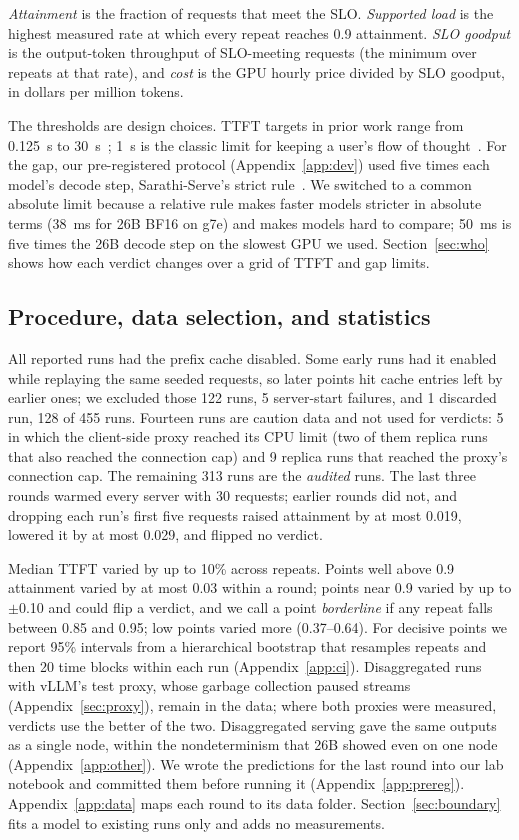 \documentclass[11pt]{article}
\begin{document}
\emph{Attainment} is the fraction of requests that meet the SLO. \emph{Supported load} is the highest measured rate at which every repeat reaches 0.9 attainment. \emph{SLO goodput} is the output-token throughput of SLO-meeting requests (the minimum over repeats at that rate), and \emph{cost} is the GPU hourly price divided by SLO goodput, in dollars per million tokens.

The thresholds are design choices. TTFT targets in prior work range from 0.125~s to 30~s~\cite{distserve,mooncake}; 1~s is the classic limit for keeping a user's flow of thought~\cite{nielsen}. For the gap, our pre-registered protocol (Appendix~\ref{app:dev}) used five times each model's decode step, Sarathi-Serve's strict rule~\cite{sarathi}. We switched to a common absolute limit because a relative rule makes faster models stricter in absolute terms (38~ms for 26B BF16 on g7e) and makes models hard to compare; 50~ms is five times the 26B decode step on the slowest GPU we used. Section~\ref{sec:who} shows how each verdict changes over a grid of TTFT and gap limits.

\subsection{Procedure, data selection, and statistics}\label{sec:procedure}
All reported runs had the prefix cache disabled. Some early runs had it enabled while replaying the same seeded requests, so later points hit cache entries left by earlier ones; we excluded those 122 runs, 5 server-start failures, and 1 discarded run, 128 of 455 runs. Fourteen runs are caution data and not used for verdicts: 5 in which the client-side proxy reached its CPU limit (two of them replica runs that also reached the connection cap) and 9 replica runs that reached the proxy's connection cap. The remaining 313 runs are the \emph{audited} runs. The last three rounds warmed every server with 30 requests; earlier rounds did not, and dropping each run's first five requests raised attainment by at most 0.019, lowered it by at most 0.029, and flipped no verdict.

Median TTFT varied by up to 10\% across repeats. Points well above 0.9 attainment varied by at most 0.03 within a round; points near 0.9 varied by up to $\pm$0.10 and could flip a verdict, and we call a point \emph{borderline} if any repeat falls between 0.85 and 0.95; low points varied more (0.37--0.64). For decisive points we report 95\% intervals from a hierarchical bootstrap that resamples repeats and then 20 time blocks within each run (Appendix~\ref{app:ci}). Disaggregated runs with vLLM's test proxy, whose garbage collection paused streams (Appendix~\ref{sec:proxy}), remain in the data; where both proxies were measured, verdicts use the better of the two. Disaggregated serving gave the same outputs as a single node, within the nondeterminism that 26B showed even on one node (Appendix~\ref{app:other}). We wrote the predictions for the last round into our lab notebook and committed them before running it (Appendix~\ref{app:prereg}). Appendix~\ref{app:data} maps each round to its data folder. Section~\ref{sec:boundary} fits a model to existing runs only and adds no measurements.
\end{document}
